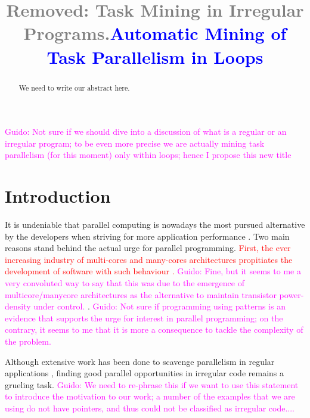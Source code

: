 \documentclass[pageno]{jpaper}
\newcommand{\guido}[1]{\noindent\textcolor{magenta}{Guido: {#1}}}
\newcommand{\rmv}[1]{\noindent\textcolor{gray}{Removed: {#1}}}
\newcommand{\new}[1]{\noindent\textcolor{blue}{ {#1}}}
\newcommand{\ed}[1]{\noindent\textcolor{red}{ {#1}}}
\newcommand{\guido}[1]{}
\newcommand{\rmv}[1]{}
\newcommand{\new}[1]{#1}
\newcommand{\ed}[1]{}
\begin{document}
\guido{Not sure if we should dive into a discussion of what is a regular or an irregular program; to be even more precise we are actually mining task parallelism (for this moment) only within loops; hence I propose this new title}
\title{\rmv{Task Mining in Irregular Programs.}\new{Automatic Mining of Task Parallelism in Loops}}

\date{}
\maketitle

\thispagestyle{empty}

\begin{abstract}
We need to write our abstract here.
\end{abstract}

\section{Introduction}
\label{sec:intro}


It is undeniable that parallel computing is nowadays the most pursued alternative by the developers  when striving for more application performance \cite{hwu2014ahead}. Two main reasons stand behind  the actual urge for parallel programming. \ed{First, the ever  increasing industry of multi-cores and many-cores architectures propitiates the development of software  with such behaviour \cite{haugen2016performance, vandierendonck2013analysis}.} \guido{Fine, but it seems to me a very convoluted way to say that this was due to the emergence of multicore/manycore  architectures as the alternative to maintain transistor power-density under control.} . \guido{Not sure if programming using patterns is an evidence that supports the urge for interest in parallel programming; on the contrary, it seems to me that it is more a consequence to tackle the complexity of the problem.} 

Although extensive  work has been done to scavenge parallelism in regular applications \cite{kulkarni2009much}, finding good  parallel opportunities in irregular code remains a grueling task. \guido{We need to re-phrase this if we want to use this statement to introduce the motivation to our work; a number of the examples that we are using do not have pointers, and thus could not be classified as irregular code....} 
\end{document}
